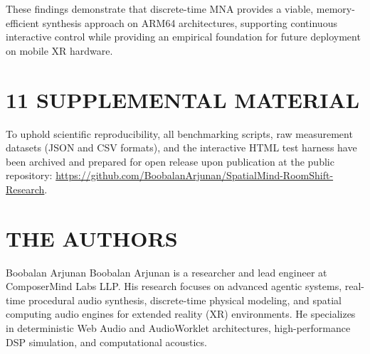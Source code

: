 \documentclass[fleqn,draft]{jaes}
\begin{document}
These findings demonstrate that discrete-time MNA provides a viable, memory-efficient synthesis approach on ARM64 architectures, supporting continuous interactive control while providing an empirical foundation for future deployment on mobile XR hardware.

\section{11 SUPPLEMENTAL MATERIAL}
To uphold scientific reproducibility, all benchmarking scripts, raw measurement datasets (JSON and CSV formats), and the interactive HTML test harness have been archived and prepared for open release upon publication at the public repository: \url{https://github.com/BoobalanArjunan/SpatialMind-RoomShift-Research}.




\section*{THE AUTHORS}

\begin{biography}{Boobalan Arjunan}
Boobalan Arjunan is a researcher and lead engineer at ComposerMind Labs LLP. His research focuses on advanced agentic systems, real-time procedural audio synthesis, discrete-time physical modeling, and spatial computing audio engines for extended reality (XR) environments. He specializes in deterministic Web Audio and AudioWorklet architectures, high-performance DSP simulation, and computational acoustics.
\end{biography}
\end{document}
